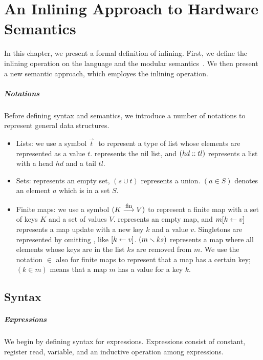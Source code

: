\chapter{An Inlining Approach to Hardware Semantics}
\label{chap:semantics}

In this chapter, we present a formal definition of inlining.  First,
we define the inlining operation on the \Kami{} language and the
modular semantics~\cite{murali-thesis}. We then present a new semantic
approach, which employes the inlining operation.

\paragraph{Notations}

Before defining syntax and semantics, we introduce a number of
notations to represent general data structures.
\begin{itemize}
\item Lists: we use a symbol $\vec{t}\;$ to represent a type of list
  whose elements are represented as a value $t$. \listnil{} represents
  the nil list, and $(hd::tl)$ represents a list with a
  head $hd$ and a tail $tl$.
\item Sets: \emptyset{} represents an empty set, $(s \cup t)$
  represents a union. $(a \in S)$ denotes an element $a$ which is in a
  set $S$.
\item Finite maps: we use a symbol $(K \stackrel{\textrm{\footnotesize{fin}}}{\longrightarrow} V)$ to represent a
  finite map with a set of keys $K$ and a set of values
  $V$. \emptymap{} represents an empty map, and $m [ k \leftarrow v ]$
  represents a map update with a new key $k$ and a value
  $v$. Singletons are represented by omitting \emptymap{}, like
  $ [ k \leftarrow v ]$.  $(m \smallsetminus{} ks)$ represents a map where all
  elements whose keys are in the list $ks$ are removed from $m$. We
  use the notation $\in$ also for finite maps to represent that a map
  has a certain key; $(k \in m)$ means that a map $m$ has a value for
  a key $k$.
\end{itemize}

\section{Syntax}

\paragraph{Expressions}
We begin by defining syntax for expressions. Expressions consist of
constant, register read, variable, and an inductive operation among
expressions.

